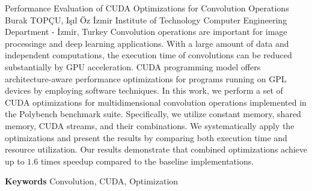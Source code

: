 
    \begin{abstract_online}{Performance Evaluation of CUDA Optimizations for Convolution Operations}{%
        Burak TOPÇU, Işıl Öz}{%
        }{%
        İzmir Institute of Technology Computer Engineering Department - İzmir, Turkey}
    Convolution operations are important for image processinge and deep learning applications. With a large amount of data and independent computations, the execution time of convolutions can be reduced substantially by GPU acceleration. CUDA programming model offers architecture-aware performance optimizations for programs running on GPL devices by employing software techniques. In this work, we perform a set of CUDA optimizations for multidimensional convolution operations implemented in the Polybench benchmark suite. Specifically, we utilize constant memory, shared memory, CUDA streams, and their combinations. We systematically apply the optimizations and present the results by comparing both execution time and resource utilization. Our results demonstrate that combined optimizations achieve up to $1.6$ times speedup compared to the baseline implementations. 
    
        \textbf{Keywords} \newline{}Convolution, CUDA, Optimization
    \end{abstract_online}
    